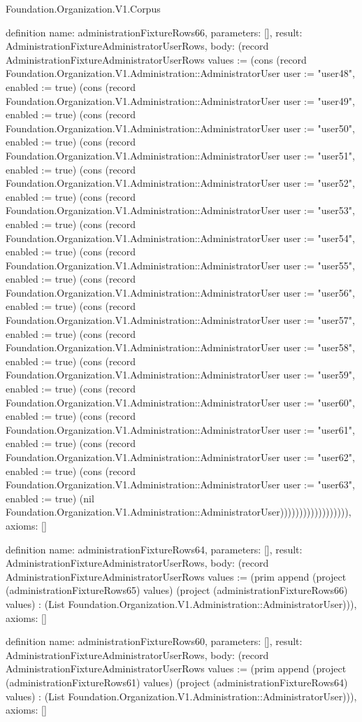 \begin{lexlean}{Foundation.Organization.V1.Corpus}
\begin{semanticmodule}
definition{
  name: administrationFixtureRows66,
  parameters: [],
  result: AdministrationFixtureAdministratorUserRows,
  body: (record AdministrationFixtureAdministratorUserRows {values := (cons (record Foundation.Organization.V1.Administration::AdministratorUser {user := "user48", enabled := true}) (cons (record Foundation.Organization.V1.Administration::AdministratorUser {user := "user49", enabled := true}) (cons (record Foundation.Organization.V1.Administration::AdministratorUser {user := "user50", enabled := true}) (cons (record Foundation.Organization.V1.Administration::AdministratorUser {user := "user51", enabled := true}) (cons (record Foundation.Organization.V1.Administration::AdministratorUser {user := "user52", enabled := true}) (cons (record Foundation.Organization.V1.Administration::AdministratorUser {user := "user53", enabled := true}) (cons (record Foundation.Organization.V1.Administration::AdministratorUser {user := "user54", enabled := true}) (cons (record Foundation.Organization.V1.Administration::AdministratorUser {user := "user55", enabled := true}) (cons (record Foundation.Organization.V1.Administration::AdministratorUser {user := "user56", enabled := true}) (cons (record Foundation.Organization.V1.Administration::AdministratorUser {user := "user57", enabled := true}) (cons (record Foundation.Organization.V1.Administration::AdministratorUser {user := "user58", enabled := true}) (cons (record Foundation.Organization.V1.Administration::AdministratorUser {user := "user59", enabled := true}) (cons (record Foundation.Organization.V1.Administration::AdministratorUser {user := "user60", enabled := true}) (cons (record Foundation.Organization.V1.Administration::AdministratorUser {user := "user61", enabled := true}) (cons (record Foundation.Organization.V1.Administration::AdministratorUser {user := "user62", enabled := true}) (cons (record Foundation.Organization.V1.Administration::AdministratorUser {user := "user63", enabled := true}) (nil Foundation.Organization.V1.Administration::AdministratorUser)))))))))))))))))}),
  axioms: []
}

definition{
  name: administrationFixtureRows64,
  parameters: [],
  result: AdministrationFixtureAdministratorUserRows,
  body: (record AdministrationFixtureAdministratorUserRows {values := (prim append (project (administrationFixtureRows65) values) (project (administrationFixtureRows66) values) : (List Foundation.Organization.V1.Administration::AdministratorUser))}),
  axioms: []
}

definition{
  name: administrationFixtureRows60,
  parameters: [],
  result: AdministrationFixtureAdministratorUserRows,
  body: (record AdministrationFixtureAdministratorUserRows {values := (prim append (project (administrationFixtureRows61) values) (project (administrationFixtureRows64) values) : (List Foundation.Organization.V1.Administration::AdministratorUser))}),
  axioms: []
}


\end{semanticmodule}
\end{lexlean}

